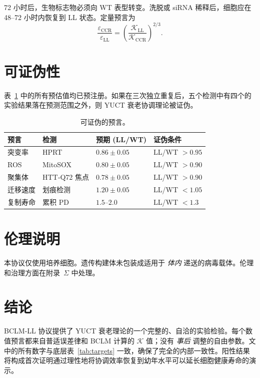 \documentclass[12pt,a4paper]{article}
\newcommand{\REL}{\mathcal{K}}          %
\begin{document}
	72 小时后，生物标志物必须向 WT 表型转变。洗脱或 siRNA 稀释后，细胞应在 48–72 小时内恢复到 LL 状态。定量预言为
	\[
	\frac{\varepsilon_{\mathrm{CCR}}}{\varepsilon_{\mathrm{LL}}} = \left(\frac{\REL_{\mathrm{LL}}}{\REL_{\mathrm{CCR}}}\right)^{2/3}.
	\]
	
	\section{可证伪性}
	\label{sec:falsifiability}
	表~\ref{tab:predictions} 中的所有预估值均已预注册。如果在三次独立重复后，五个检测中有四个的实验结果落在预测范围之外，则 YUCT 衰老协调理论被证伪。
	
	\begin{table}[H]
		\centering
		\caption{可证伪的预言。}
		\label{tab:predictions}
		\begin{tabular}{@{}llll@{}}
			\toprule
			\textbf{预言} & \textbf{检测} & \textbf{预期 (LL/WT)} & \textbf{证伪条件} \\
			\midrule
			突变率       & HPRT           & \(0.86 \pm 0.05\) & LL/WT \(> 0.95\) \\
			ROS                 & MitoSOX        & \(0.80 \pm 0.05\) & LL/WT \(> 0.90\) \\
			聚集体          & HTT‑Q72 焦点   & \(0.78 \pm 0.05\) & LL/WT \(> 0.90\) \\
			迁移速度     & 划痕检测  & \(1.20 \pm 0.05\) & LL/WT \(< 1.05\) \\
			复制寿命 & 累积 PD  & \(1.5\)–\(2.0\)    & LL/WT \(< 1.3\) \\
			\bottomrule
		\end{tabular}
	\end{table}
	
	\section{伦理说明}
	\label{sec:ethics}
	本协议仅使用培养细胞。遗传构建体未包装成适用于 \textit{体内} 递送的病毒载体。伦理和治理方面在附录~\(\Sigma\) 中处理。
	
	\section{结论}
	BCLM‑LL 协议提供了 YUCT 衰老理论的一个完整的、自洽的实验检验。每个数值预言都来自普适误差律和 BCLM 计算的 \(\REL\) 值；没有 \emph{事后} 调整的自由参数。文中的所有数字与底层表~\ref{tab:targets} 一致，确保了完全的内部一致性。阳性结果将构成首次证明通过理性地将协调效率恢复到幼年水平可以延长细胞健康寿命的演示。
	
\end{document}

